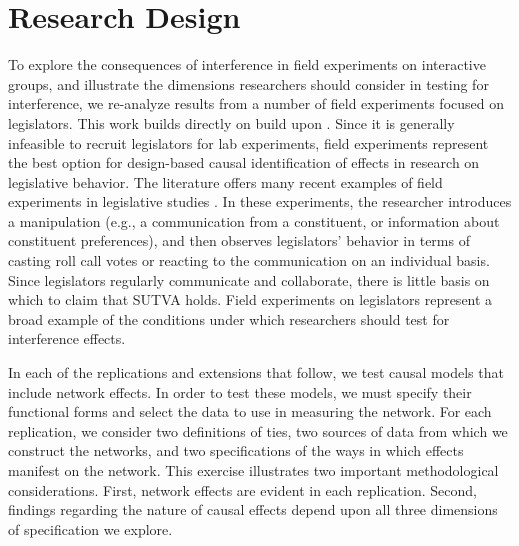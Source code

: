 \documentclass[12pt]{article}
\begin{document}
\section{Research Design}

To explore the consequences of interference in field experiments on interactive groups, and illustrate the dimensions researchers should consider in testing for interference, we re-analyze results from a number of field experiments focused on legislators. This work builds directly on build upon \citet{coppock2014information}. Since it is generally infeasible to recruit legislators for lab experiments, field experiments represent the best option for design-based causal identification of effects in research on legislative behavior. The literature offers many recent examples of field experiments in legislative studies \citep[e.g., ][]{bergan2009does,butler2011politicians,butler2012field,broockman2013black,nyhan2015effect,bergan2015call}. In these experiments, the researcher introduces a manipulation (e.g., a communication from a constituent, or information about constituent preferences), and then observes legislators' behavior in terms of casting roll call votes or reacting to the communication on an individual basis. Since legislators regularly communicate and collaborate, there is little basis on which to claim that SUTVA holds. Field experiments on legislators represent a broad example of the conditions under which researchers should test for interference effects.

In each of the replications and extensions that follow, we test causal models that include network effects. In order to test these models, we must specify their functional forms and select the data to use in measuring the network. For each replication, we consider two definitions of ties, two sources of data from which we construct the networks, and two specifications of the ways in which effects manifest on the network. This exercise illustrates two important methodological considerations. First, network effects are evident in each replication. Second, findings regarding the nature of causal effects depend upon all three dimensions of specification we explore.



\subsection{\citet{butler2011can}}
\end{document}
